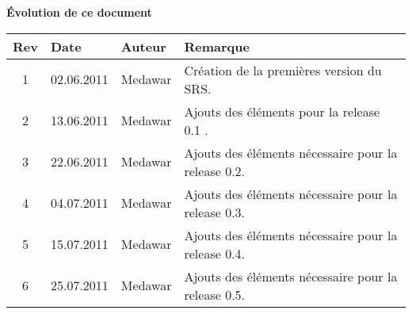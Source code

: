 \begin{large}
\textbf{Évolution de ce  document\\}
\end{large}
\begin{tabular}{|c|l|l|l|}
\hline  Rev &  Date &  Auteur & Remarque \\ 
\hline  1 &  02.06.2011 & Medawar  & Création de la premières version du SRS. \\ 
\hline  2 &  13.06.2011 & Medawar  & Ajouts des éléments pour la release 0.1  . \\ 
\hline  3 &  22.06.2011 & Medawar  & Ajouts des éléments nécessaire pour la release 0.2. \\ 
\hline  4 &  04.07.2011 & Medawar  & Ajouts des éléments nécessaire pour la release 0.3. \\ 
\hline  5 &  15.07.2011 & Medawar  & Ajouts des éléments nécessaire pour la release 0.4. \\ 
\hline  6 &  25.07.2011 & Medawar  & Ajouts des éléments nécessaire pour la release 0.5. \\ 
\hline 
\end{tabular} 